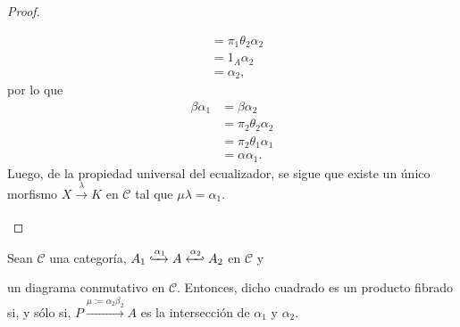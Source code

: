 \documentclass[tesis]{subfiles}
\begin{document}
\begin{proof}
\begin{enumerate}[label=(\alph*)]
\begin{align*}
                         &= \pi_1\theta_2\alpha_2 \\
                         &= 1_A\alpha_2 \\
                         &= \alpha_2,
            \end{align*}
            por lo que
            \begin{align*}
                \beta\alpha_1 &= \beta\alpha_2 \\
                              &= \pi_2\theta_2\alpha_2 \\
                              &= \pi_2\theta_1\alpha_1 \\
                              &= \alpha\alpha_1.
            \end{align*}
            Luego, de la propiedad universal del ecualizador, se sigue que existe un único morfismo $X\xrightarrow[]{\lambda} K$ en $\mathscr{C}$ tal que $\mu\lambda = \alpha_1$.
    \end{enumerate}
\end{proof}

\begin{Prop}\label{Mendoza-1.3.2}
    Sean $\mathscr{C}$ una categoría, $A_1\xhookrightarrow[]{\alpha_1} A\xhookleftarrow[]{\alpha_2} A_2$ en $\mathscr{C}$ y
    \begin{center}
    \end{center}
    un diagrama conmutativo en $\mathscr{C}$. Entonces, dicho cuadrado es un producto fibrado si, y sólo si, $P\xrightarrow[]{\mu:=\alpha_2\beta_2} A$ es la intersección de $\alpha_1$ y $\alpha_2$.
\end{Prop}
\end{document}
